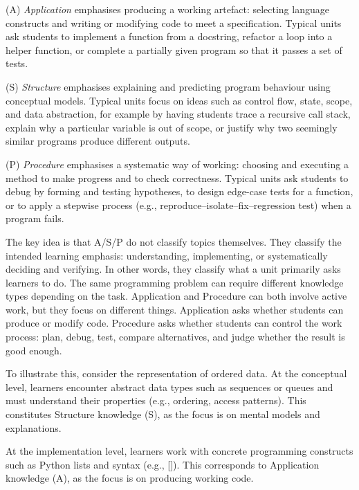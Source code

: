 \documentclass{article}
\begin{document}
(A) \emph{Application} emphasises producing a working artefact: selecting language constructs and writing or modifying code to meet a specification. Typical units ask students to implement a function from a docstring, refactor a loop into a helper function, or complete a partially given program so that it passes a set of tests.\par

(S) \emph{Structure} emphasises explaining and predicting program behaviour using conceptual models. Typical units focus on ideas such as control flow, state, scope, and data abstraction, for example by having students trace a recursive call stack, explain why a particular variable is out of scope, or justify why two seemingly similar programs produce different outputs.\par

(P) \emph{Procedure} emphasises a systematic way of working: choosing and executing a method to make progress and to check correctness. Typical units ask students to debug by forming and testing hypotheses, to design edge-case tests for a function, or to apply a stepwise process (e.g., reproduce--isolate--fix--regression test) when a program fails.\par

The key idea is that A/S/P do not classify topics themselves. They classify the intended learning emphasis: understanding, implementing, or systematically deciding and verifying. In other words, they classify what a unit primarily asks learners to do. The same programming problem can require different knowledge types depending on the task.
Application and Procedure can both involve active work, but they focus on different things. Application asks whether students can produce or modify code. Procedure asks whether students can control the work process: plan, debug, test, compare alternatives, and judge whether the result is good enough.

To illustrate this, consider the representation of ordered data. At the conceptual level, learners encounter abstract data types such as sequences or queues and must understand their properties (e.g., ordering, access patterns). This constitutes Structure knowledge (S), as the focus is on mental models and explanations.\par

At the implementation level, learners work with concrete programming constructs such as Python lists and syntax (e.g., []). This corresponds to Application knowledge (A), as the focus is on producing working code.\par
\end{document}
